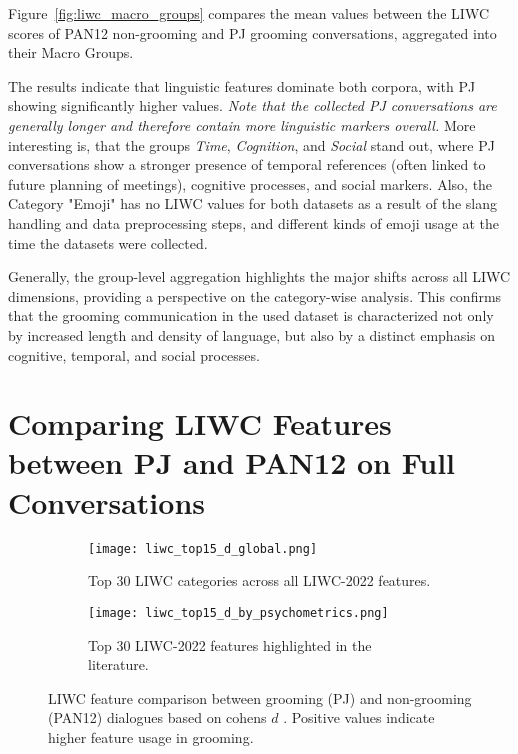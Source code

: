 Figure~\ref{fig:liwc_macro_groups} compares the mean values between the LIWC scores of PAN12 non-grooming and PJ grooming conversations, aggregated into their Macro Groups.

The results indicate that linguistic features dominate both corpora, with PJ showing significantly higher values. \textit{Note that the collected PJ conversations are generally longer and therefore contain more linguistic markers overall.} More interesting is, that the groups \textit{Time}, \textit{Cognition}, and \textit{Social} stand out, where PJ conversations show a stronger presence of temporal references (often linked to future planning of meetings), cognitive processes, and social markers. Also, the Category "Emoji" has no LIWC values for both datasets as a result of the slang handling and data preprocessing steps, and different kinds of emoji usage at the time the datasets were collected.

Generally, the group-level aggregation highlights the major shifts across all LIWC dimensions, providing a perspective on the category-wise analysis. This confirms that the grooming communication in the used dataset is characterized not only by increased length and density of language, but also by a distinct emphasis on cognitive, temporal, and social processes.


\section{Comparing LIWC Features between PJ and PAN12 on Full Conversations} \label{sec:liwc_global_analysis}

\begin{figure}[ht]
    \centering
    \begin{subfigure}[t]{0.48\textwidth}
        \centering
        \texttt{[image: liwc\_top15\_d\_global.png]}
        \caption{Top 30 LIWC categories across all LIWC-2022 features.}
    \end{subfigure}
    \hfill
    \begin{subfigure}[t]{0.48\textwidth}
        \centering
        \texttt{[image: liwc\_top15\_d\_by\_psychometrics.png]}
        \caption{Top 30 LIWC-2022 features highlighted in the literature.}
    \end{subfigure}
    \caption[LIWC feature Comparison (PJ, PAN12) over Complete Conversations]{LIWC feature comparison between grooming (PJ) and non-grooming (PAN12) dialogues based on cohens $d$ \cite{cohen1988}. Positive values indicate higher feature usage in grooming.}
    \label{fig:liwc_global_analysis}
\end{figure}

